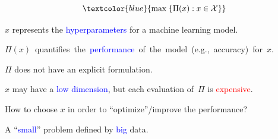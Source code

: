 \documentclass[slidestop,mathserif,xcolor=dvipsnames]{beamer}
\newcommand{\blue}[1]{\textcolor{blue}{#1}}
\newcommand{\red}[1]{\textcolor{red}{#1}}
\begin{document}
\begin{frame}
\begin{figure}
\end{figure}

        \vspace{-2ex}
        \begin{equation*}
            \blue{\max\;\{\Pi(x) \mathrel{:} x \in \mathcal{X}\}}
        \vspace{0.2ex}
        \end{equation*}

        \begin{itemize}
            {
            \item $x$ represents the \blue{hyperparameters} for
                a machine learning model. %
        \vspace{0.5ex}
      \item \mbox{$\Pi(x)$ quantifies the \blue{performance} of the model
          (e.g., accuracy) for $x$.}
        \vspace{0.5ex}
        \item $\Pi$ does not have an explicit formulation.
        \vspace{0.5ex}
    \item $x$ may have a \blue{low dimension}, but each evaluation
          of~$\Pi$ is \red{expensive}.%
        \vspace{0.5ex}
        \item How to choose $x$ in order to ``optimize''/improve the performance?
        \vspace{0.5ex}
    \item A ``\blue{small}'' problem defined by \blue{big} data.
    }
        \end{itemize}


 \end{frame}
\end{document}
